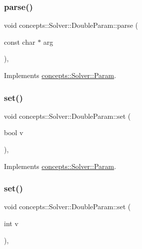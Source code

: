 \subsubsection{\texorpdfstring{parse()}{parse()}}
{\footnotesize\ttfamily void concepts\+::\+Solver\+::\+Double\+Param\+::parse (\begin{DoxyParamCaption}\item[{const char $\ast$}]{arg }\end{DoxyParamCaption})\hspace{0.3cm}{\ttfamily [inline]}, {\ttfamily [virtual]}}



Implements \hyperlink{classconcepts_1_1_solver_1_1_param_a0c2e4d895747668b01339db9226eceae}{concepts\+::\+Solver\+::\+Param}.

\mbox{\label{classconcepts_1_1_solver_1_1_double_param_a006e726301f821c96edb00b4ca2ea345}} 
\subsubsection{\texorpdfstring{set()}{set()}\hspace{0.1cm}{\footnotesize\ttfamily [1/3]}}
{\footnotesize\ttfamily void concepts\+::\+Solver\+::\+Double\+Param\+::set (\begin{DoxyParamCaption}\item[{bool}]{v }\end{DoxyParamCaption})\hspace{0.3cm}{\ttfamily [inline]}, {\ttfamily [virtual]}}



Implements \hyperlink{classconcepts_1_1_solver_1_1_param_aa525a1a88dd771eaf5d66f35323fbb86}{concepts\+::\+Solver\+::\+Param}.

\mbox{\label{classconcepts_1_1_solver_1_1_double_param_a4648d672a792ded79977319d968fd497}} 
\subsubsection{\texorpdfstring{set()}{set()}\hspace{0.1cm}{\footnotesize\ttfamily [2/3]}}
{\footnotesize\ttfamily void concepts\+::\+Solver\+::\+Double\+Param\+::set (\begin{DoxyParamCaption}\item[{int}]{v }\end{DoxyParamCaption})\hspace{0.3cm}{\ttfamily [inline]}, {\ttfamily [virtual]}}



